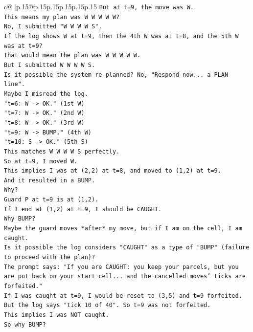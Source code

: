\documentclass{article}
\begin{document}
{\begin{supertabular}{c@{$\;$}|p{.15\linewidth}@{}p{.15\linewidth}p{.15\linewidth}p{.15\linewidth}p{.15\linewidth}p{.15\linewidth}}
{{{\texttt{But at t=9, the move was W.} \\
\texttt{This means my plan was W W W W W?} \\
\texttt{No, I submitted "W W W W S".} \\
\texttt{If the log shows W at t=9, then the 4th W was at t=8, and the 5th W was at t=9?} \\
\texttt{That would mean the plan was W W W W W.} \\
\texttt{But I submitted W W W W S.} \\
\texttt{Is it possible the system re{-}planned? No, "Respond now... a PLAN line".} \\
\texttt{Maybe I misread the log.} \\
\texttt{"t=6: W {-}> OK." (1st W)} \\
\texttt{"t=7: W {-}> OK." (2nd W)} \\
\texttt{"t=8: W {-}> OK." (3rd W)} \\
\texttt{"t=9: W {-}> BUMP." (4th W)} \\
\texttt{"t=10: S {-}> OK." (5th S)} \\
\texttt{This matches W W W W S perfectly.} \\
\texttt{So at t=9, I moved W.} \\
\texttt{This implies I was at (2,2) at t=8, and moved to (1,2) at t=9.} \\
\texttt{And it resulted in a BUMP.} \\
\texttt{Why?} \\
\texttt{Guard P at t=9 is at (1,2).} \\
\texttt{If I end at (1,2) at t=9, I should be CAUGHT.} \\
\texttt{Why BUMP?} \\
\texttt{Maybe the guard moves *after* my move, but if I am on the cell, I am caught.} \\
\texttt{Is it possible the log considers "CAUGHT" as a type of "BUMP" (failure to proceed with the plan)?} \\
\texttt{The prompt says: "If you are CAUGHT: you keep your parcels, but you are put back on your start cell... and the cancelled moves' ticks are forfeited."} \\
\texttt{If I was caught at t=9, I would be reset to (3,5) and t=9 forfeited.} \\
\texttt{But the log says "tick 10 of 40". So t=9 was not forfeited.} \\
\texttt{This implies I was NOT caught.} \\
\texttt{So why BUMP?} \\
}}}
\end{supertabular}}
\end{document}
